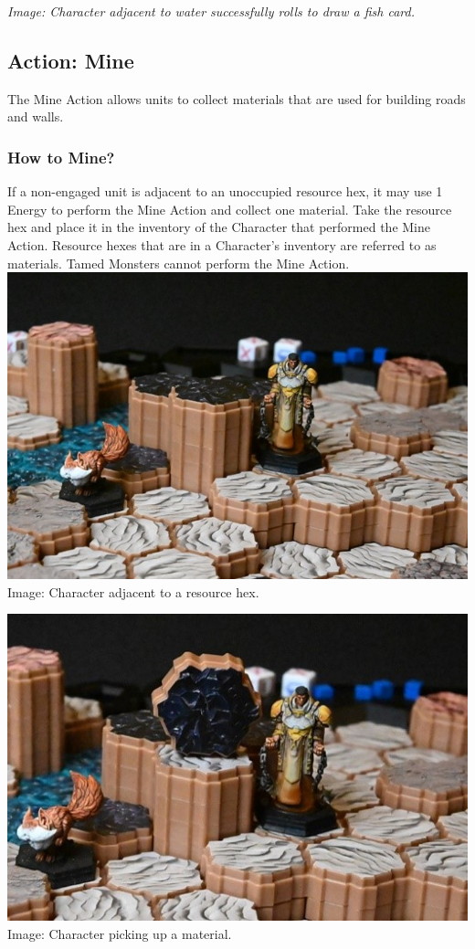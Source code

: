 \documentclass[../main.tex]{subfiles}
\begin{document}
\textit{Image: Character adjacent to water successfully rolls to draw a fish card.}

\subsection{Action: Mine}
The Mine Action allows units to collect materials that are used for building roads and walls.
\subsubsection{How to Mine? }
If a non-engaged unit is adjacent to an unoccupied resource hex, it may use 1 Energy to perform the Mine Action and collect one material. Take the resource hex and place it in the inventory of the Character that performed the Mine Action. Resource hexes that are in a Character’s inventory are referred to as materials. Tamed Monsters cannot perform the Mine Action.
\centering
    \includegraphics[width=1\linewidth]{chapters//ActionsandEnergy/TimeStrikeCharMine1.jpg} 
Image: Character adjacent to a resource hex. 

\centering
    \includegraphics[width=1\linewidth]{chapters//ActionsandEnergy/TimeStrikeCharMine2.jpg}  
Image: Character picking up a material. 
\end{document}
